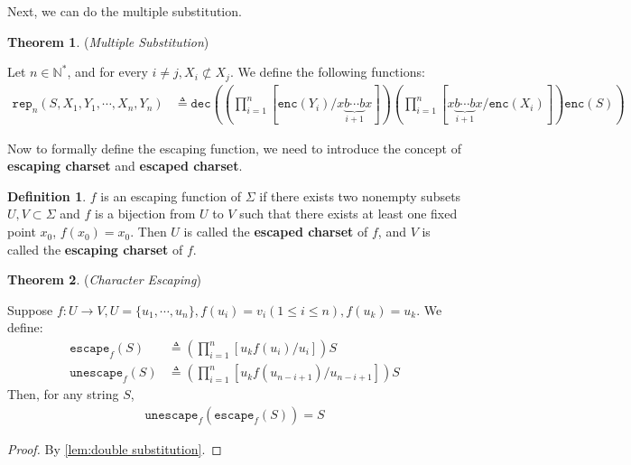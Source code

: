 \documentclass{article}
\theoremstyle{definition}
\newtheorem{theorem}{Theorem}[section]
\newtheorem{definition}{Definition}[section]
\begin{document}
Next, we can do the multiple substitution.

\begin{theorem}
    (\emph{Multiple Substitution})

    Let $n\in \mathbb{N}^*$, and for every $i\neq j, X_i \not\subset X_j$. We define the following functions:
    \begin{align}
        \mathtt{rep}_n(S, X_1, Y_1, \cdots, X_n, Y_n) & \triangleq \mathtt{dec}\left((\prod_{i=1}^n[\mathtt{enc}(Y_i)/x\underbrace{b\cdots b}_{i+1}x])(\prod_{i=1}^n[x\underbrace{b\cdots b}_{i+1}x/\mathtt{enc}(X_i)])\mathtt{enc}(S)\right)
    \end{align}
    \label{lem:multiple substitution}
\end{theorem}

Now to formally define the escaping function, we need to introduce the concept of \textbf{escaping charset} and \textbf{escaped charset}.

\begin{definition}
    $f$ is an escaping function of $\Sigma$ if there exists two nonempty subsets $U,V\subset \Sigma$ and $f$ is a bijection from $U$ to $V$ such that there exists at least one fixed point $x_0$, $f(x_0)=x_0$. Then $U$ is called the \textbf{escaped charset} of $f$, and $V$ is called the \textbf{escaping charset} of $f$.
\end{definition}

\begin{theorem}
    (\emph{Character Escaping})

    Suppose $f: U\rightarrow V, U=\{u_1,\cdots,u_n\}, f(u_i) = v_i (1\leq i\leq n), f(u_k)=u_k$.
    We define:
    \begin{align}
        \mathtt{escape}_f(S)   & \triangleq (\prod_{i=1}^{n}[u_kf(u_i)/u_i])S             \\
        \mathtt{unescape}_f(S) & \triangleq (\prod_{i=1}^{n}[u_kf(u_{n-i+1})/u_{n-i+1}])S
    \end{align}
    Then, for any string $S$,
    \begin{align}
        \mathtt{unescape}_f(\mathtt{escape}_f(S)) = S
    \end{align}
\end{theorem}

\begin{proof}
    By \ref{lem:double substitution}.
\end{proof}
\end{document}
